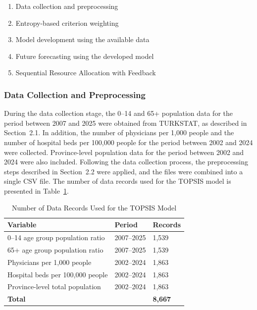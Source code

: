 \documentclass[final, 9pt, twocolumn]{saucis}
\begin{document}
\begin{enumerate}
    \item Data collection and preprocessing
    \item Entropy-based criterion weighting
    \item Model development using the available data
    \item Future forecasting using the developed model
    \item Sequential Resource Allocation with Feedback
\end{enumerate}

\subsubsection{Data Collection and Preprocessing}

During the data collection stage, the 0--14 and 65+ population data for the period between 2007 and 2025 were obtained from TURKSTAT, as described in Section~2.1. In addition, the number of physicians per 1,000 people and the number of hospital beds per 100,000 people for the period between 2002 and 2024 were collected. Province-level population data for the period between 2002 and 2024 were also included. Following the data collection process, the preprocessing steps described in Section~2.2 were applied, and the files were combined into a single CSV file. The number of data records used for the TOPSIS model is presented in Table~\ref{tab:topsis_data}.

\begin{table}[h]
\centering
\caption{Number of Data Records Used for the TOPSIS Model}
\label{tab:topsis_data}
\begin{tabular}{p{4.5cm} p{1.5cm} p{1cm}}
\hline
\textbf{Variable} & \textbf{Period} & \textbf{Records} \\
\hline
0--14 age group population ratio    & 2007--2025 & 1{,}539 \\
65+ age group population ratio      & 2007--2025 & 1{,}539 \\
Physicians per 1,000 people            & 2002--2024 & 1{,}863 \\
Hospital beds per 100,000 people    & 2002--2024 & 1{,}863 \\
Province-level total population     & 2002--2024 & 1{,}863 \\
\hline
\textbf{Total}                      &            & \textbf{8{,}667} \\
\hline
\end{tabular}
\end{table}
\end{document}
